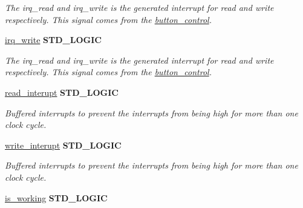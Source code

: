 \begin{DoxyCompactItemize}
\begin{DoxyCompactList}\small\item\em The irq\-\_\-read and irq\-\_\-write is the generated interrupt for read and write respectively. This signal comes from the \hyperlink{classbutton__control}{button\-\_\-control}. \end{DoxyCompactList}\item 
\hypertarget{classbutton__and__hex__wrapper_1_1HID__wrapper_a8ab8f71af5c81e96d6f46be958e84653}{\hyperlink{classbutton__and__hex__wrapper_1_1HID__wrapper_a8ab8f71af5c81e96d6f46be958e84653}{irq\-\_\-write} {\bfseries \textcolor{comment}{S\-T\-D\-\_\-\-L\-O\-G\-I\-C}\textcolor{vhdlchar}{ }} }\label{classbutton__and__hex__wrapper_1_1HID__wrapper_a8ab8f71af5c81e96d6f46be958e84653}

\begin{DoxyCompactList}\small\item\em The irq\-\_\-read and irq\-\_\-write is the generated interrupt for read and write respectively. This signal comes from the \hyperlink{classbutton__control}{button\-\_\-control}. \end{DoxyCompactList}\item 
\hypertarget{classbutton__and__hex__wrapper_1_1HID__wrapper_ac97404cefc3f94e594280342f6ac292f}{\hyperlink{classbutton__and__hex__wrapper_1_1HID__wrapper_ac97404cefc3f94e594280342f6ac292f}{read\-\_\-interupt} {\bfseries \textcolor{comment}{S\-T\-D\-\_\-\-L\-O\-G\-I\-C}\textcolor{vhdlchar}{ }} }\label{classbutton__and__hex__wrapper_1_1HID__wrapper_ac97404cefc3f94e594280342f6ac292f}

\begin{DoxyCompactList}\small\item\em Buffered interrupts to prevent the interrupts from being high for more than one clock cycle. \end{DoxyCompactList}\item 
\hypertarget{classbutton__and__hex__wrapper_1_1HID__wrapper_a7edc05ba8a892041bd5c97a689fdf48d}{\hyperlink{classbutton__and__hex__wrapper_1_1HID__wrapper_a7edc05ba8a892041bd5c97a689fdf48d}{write\-\_\-interupt} {\bfseries \textcolor{comment}{S\-T\-D\-\_\-\-L\-O\-G\-I\-C}\textcolor{vhdlchar}{ }} }\label{classbutton__and__hex__wrapper_1_1HID__wrapper_a7edc05ba8a892041bd5c97a689fdf48d}

\begin{DoxyCompactList}\small\item\em Buffered interrupts to prevent the interrupts from being high for more than one clock cycle. \end{DoxyCompactList}\item 
\hypertarget{classbutton__and__hex__wrapper_1_1HID__wrapper_a1920c119e2d5288312f2a3d85de0cdc0}{\hyperlink{classbutton__and__hex__wrapper_1_1HID__wrapper_a1920c119e2d5288312f2a3d85de0cdc0}{is\-\_\-working} {\bfseries \textcolor{comment}{S\-T\-D\-\_\-\-L\-O\-G\-I\-C}\textcolor{vhdlchar}{ }} }\label{classbutton__and__hex__wrapper_1_1HID__wrapper_a1920c119e2d5288312f2a3d85de0cdc0}


\end{DoxyCompactItemize}
